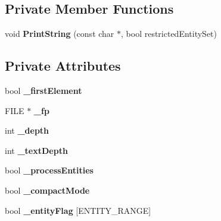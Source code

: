 \subsection*{Private Member Functions}
\begin{DoxyCompactItemize}
\item 
\hypertarget{classtinyxml2_1_1_x_m_l_printer_a5495e504053f63f2c4d603327314fa91}{}void {\bfseries Print\+String} (const char $\ast$, bool restricted\+Entity\+Set)\label{classtinyxml2_1_1_x_m_l_printer_a5495e504053f63f2c4d603327314fa91}

\end{DoxyCompactItemize}
\subsection*{Private Attributes}
\begin{DoxyCompactItemize}
\item 
\hypertarget{classtinyxml2_1_1_x_m_l_printer_abbd7ac45d97ae5eceec12d6c058119f9}{}bool {\bfseries \+\_\+first\+Element}\label{classtinyxml2_1_1_x_m_l_printer_abbd7ac45d97ae5eceec12d6c058119f9}

\item 
\hypertarget{classtinyxml2_1_1_x_m_l_printer_a79d91decf17990f7ce18b592f3fdf44e}{}F\+I\+L\+E $\ast$ {\bfseries \+\_\+fp}\label{classtinyxml2_1_1_x_m_l_printer_a79d91decf17990f7ce18b592f3fdf44e}

\item 
\hypertarget{classtinyxml2_1_1_x_m_l_printer_a19cd59a9dbe4b666264803fb91ac8ec1}{}int {\bfseries \+\_\+depth}\label{classtinyxml2_1_1_x_m_l_printer_a19cd59a9dbe4b666264803fb91ac8ec1}

\item 
\hypertarget{classtinyxml2_1_1_x_m_l_printer_a3c5a442e57131faefde97188e92144f3}{}int {\bfseries \+\_\+text\+Depth}\label{classtinyxml2_1_1_x_m_l_printer_a3c5a442e57131faefde97188e92144f3}

\item 
\hypertarget{classtinyxml2_1_1_x_m_l_printer_a3e27c4b4fe791a96e4e139b5034e190b}{}bool {\bfseries \+\_\+process\+Entities}\label{classtinyxml2_1_1_x_m_l_printer_a3e27c4b4fe791a96e4e139b5034e190b}

\item 
\hypertarget{classtinyxml2_1_1_x_m_l_printer_a7bc067aa3f0dcee68e4ac75e19117bd0}{}bool {\bfseries \+\_\+compact\+Mode}\label{classtinyxml2_1_1_x_m_l_printer_a7bc067aa3f0dcee68e4ac75e19117bd0}

\item 
\hypertarget{classtinyxml2_1_1_x_m_l_printer_a334eb34c43f21daebef9341b4768c275}{}bool {\bfseries \+\_\+entity\+Flag} \mbox{[}E\+N\+T\+I\+T\+Y\+\_\+\+R\+A\+N\+G\+E\mbox{]}\label{classtinyxml2_1_1_x_m_l_printer_a334eb34c43f21daebef9341b4768c275}


\end{DoxyCompactItemize}
